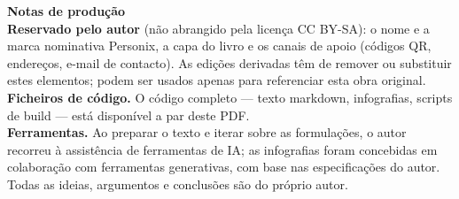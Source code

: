 \clearpage
\thispagestyle{empty}
\begin{flushleft}\small\sffamily
\textbf{Notas de produção}\\[1.2em]

\textbf{Reservado pelo autor} (não abrangido pela licença CC BY-SA): o
nome e a marca nominativa Personix, a capa do livro e os canais de apoio
(códigos QR, endereços, e-mail de contacto). As edições derivadas têm de
remover ou substituir estes elementos; podem ser usados apenas para
referenciar esta obra original.\\[1.2em]

\textbf{Ficheiros de código.} O código completo --- texto markdown, infografias,
scripts de build --- está disponível a par deste PDF.\\[1.2em]

\textbf{Ferramentas.} Ao preparar o texto e iterar sobre as formulações, o
autor recorreu à assistência de ferramentas de IA; as infografias foram
concebidas em colaboração com ferramentas generativas, com base nas
especificações do autor. Todas as ideias, argumentos e conclusões são do
próprio autor.
\end{flushleft}
\clearpage
